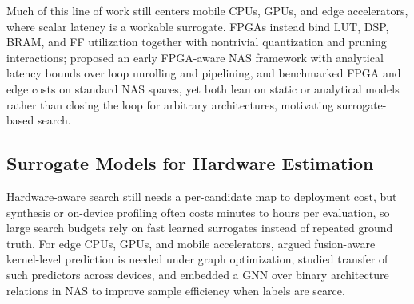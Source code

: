 \documentclass[11pt]{article}
\begin{document}
Much of this line of work still centers mobile CPUs, GPUs, and edge accelerators, where scalar latency is a workable surrogate.
FPGAs instead bind LUT, DSP, BRAM, and FF utilization together with nontrivial quantization and pruning interactions; \citet{jiang2019accuracy} proposed an early FPGA-aware NAS framework with analytical latency bounds over loop unrolling and pipelining, and \citet{li2021hw} benchmarked FPGA and edge costs on standard NAS spaces, yet both lean on static or analytical models rather than closing the loop for arbitrary architectures, motivating surrogate-based search.

\subsection{Surrogate Models for Hardware Estimation}

Hardware-aware search still needs a per-candidate map to deployment cost, but synthesis or on-device profiling often costs minutes to hours per evaluation, so large search budgets rely on fast learned surrogates instead of repeated ground truth.
For edge CPUs, GPUs, and mobile accelerators, \citet{zhang2021nn} argued fusion-aware kernel-level prediction is needed under graph optimization, \citet{akhauri2024latency} studied transfer of such predictors across devices, and \citet{dudziak2020brp} embedded a GNN over binary architecture relations in NAS to improve sample efficiency when labels are scarce.
\end{document}
